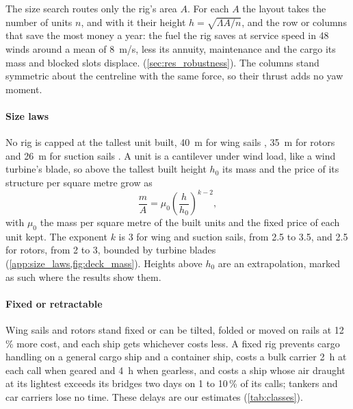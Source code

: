 The size search routes only the rig's area $A$. For each $A$ the layout takes the number of units $n$, and with it their height $h=\sqrt{\Lambda A/n}$, and the row or columns that save the most money a year: the fuel the rig saves at service speed in 48 winds around a mean of \SI{8}{m/s}, less its annuity, maintenance and the cargo its mass and blocked slots displace.  (\cref{sec:res_robustness}). The columns stand symmetric about the centreline with the same force, so their thrust adds no yaw moment.

\paragraph{Size laws} No rig is capped at the tallest unit built, \SI{40}{m} for wing sails \citep{alfalaval2026oceanbird}, \SI{35}{m} for rotors \citep{maritimeexecutive2024sohar} and \SI{26}{m} for suction sails \citep{offshoreenergy2025orchard}. A unit is a cantilever under wind load, like a wind turbine's blade, so above the tallest built height $h_0$ its mass and the price of its structure per square metre grow as
\begin{equation}
\frac{m}{A} = \mu_0 \left(\frac{h}{h_0}\right)^{k-2},
\label{eq:size_law}
\end{equation}
with $\mu_0$ the mass per square metre of the built units and the fixed price of each unit kept. The exponent $k$ is 3 for wing and suction sails, from 2.5 to 3.5, and 2.5 for rotors, from 2 to 3, bounded by turbine blades \citep{fingersh2006} (\cref{app:size_laws,fig:deck_mass}). Heights above $h_0$ are an extrapolation, marked as such where the results show them.

\paragraph{Fixed or retractable} Wing sails and rotors stand fixed or can be tilted, folded or moved on rails at 12\,\% more cost, and each ship gets whichever costs less. A fixed rig prevents cargo handling on a general cargo ship and a container ship, costs a bulk carrier \SI{2}{h} at each call when geared and \SI{4}{h} when gearless, and costs a ship whose air draught at its lightest exceeds its bridges two days on 1 to 10\,\% of its calls; tankers and car carriers lose no time. These delays are our estimates (\cref{tab:classes}).

